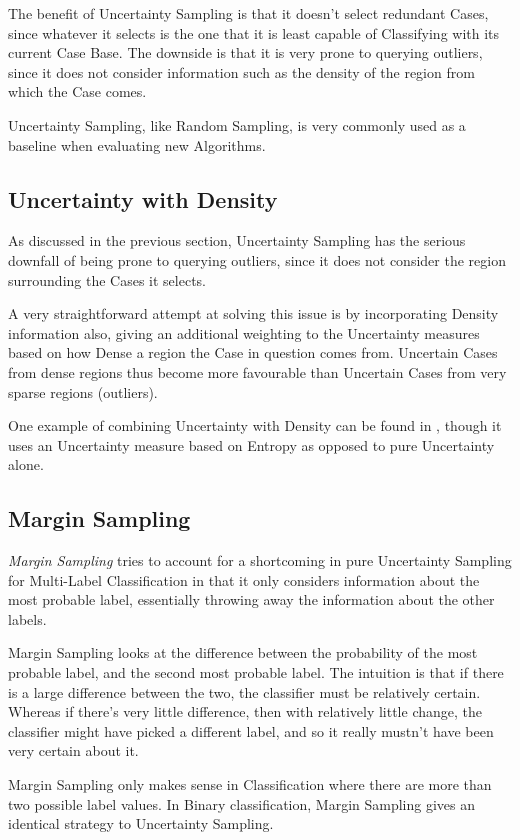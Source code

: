 \documentclass[a4paper,11pt]{report}
\begin{document}
The benefit of Uncertainty Sampling is that it doesn't select redundant Cases, since whatever it selects is the one that it is least capable of Classifying with its current Case Base. The downside is that it is very prone to querying outliers, since it does not consider information such as the density of the region from which the Case comes.

Uncertainty Sampling, like Random Sampling, is very commonly used as a baseline when evaluating new Algorithms.

\subsection{Uncertainty with Density}
As discussed in the previous section, Uncertainty Sampling has the serious downfall of being prone to querying outliers, since it does not consider the region surrounding the Cases it selects.

A very straightforward attempt at solving this issue is by incorporating Density information also, giving an additional weighting to the Uncertainty measures based on how Dense a region the Case in question comes from. Uncertain Cases from dense regions thus become more favourable than Uncertain Cases from very sparse regions (outliers).

One example of combining Uncertainty with Density can be found in \citet{Zhu2008}, though it uses an Uncertainty measure based on Entropy as opposed to pure Uncertainty alone.

\subsection{Margin Sampling}

\emph{Margin Sampling} tries to account for a shortcoming in pure Uncertainty Sampling for Multi-Label Classification in that it only considers information about the most probable label, essentially throwing away the information about the other labels.

Margin Sampling looks at the difference between the probability of the most probable label, and the second most probable label. The intuition is that if there is a large difference between the two, the classifier must be relatively certain. Whereas if there's very little difference, then with relatively little change, the classifier might have picked a different label, and so it really mustn't have been very certain about it.

Margin Sampling only makes sense in Classification where there are more than two possible label values. In Binary classification, Margin Sampling gives an identical strategy to Uncertainty Sampling.
\end{document}
